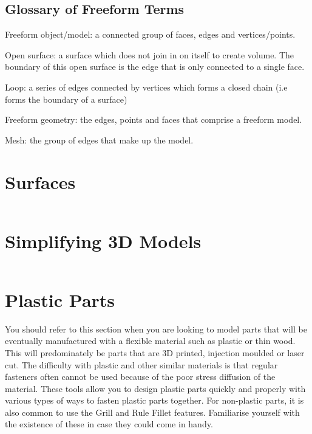 \subsection{Glossary of Freeform Terms}

Freeform object/model: a connected group of faces, edges and vertices/points.

Open surface: a surface which does not join in on itself to create volume. The boundary of this open surface is the edge that is only connected to a single face.

Loop: a series of edges connected by vertices which forms a closed chain (i.e forms the boundary of a surface)

Freeform geometry: the edges, points and faces that comprise a freeform model.

Mesh: the group of edges that make up the model.

\section{Surfaces}
\label{section: 3D Model Surface}

$ $

\section{Simplifying 3D Models}

$ $

\section{Plastic Parts}

\begin{when-to-read}
    You should refer to this section when you are looking to model parts that will be eventually manufactured with a flexible material such as plastic or thin wood. This will predominately be parts that are 3D printed, injection moulded or laser cut. The difficulty with plastic and other similar materials is that regular fasteners often cannot be used because of the poor stress diffusion of the material. These tools allow you to design plastic parts quickly and properly with various types of ways to fasten plastic parts together.
    \tcblower
    For non-plastic parts, it is also common to use the Grill and Rule Fillet features. Familiarise yourself with the existence of these in case they could come in handy.
\end{when-to-read}

